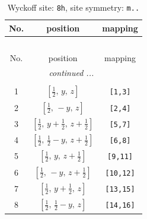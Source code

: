 \documentclass[fleqn,8pt]{jsarticle}
\begin{document}
\begin{longtable}{ccc}
\caption{Wyckoff site: {\tt 8h}, site symmetry: {\tt m..}}
 \\
 \hline \hline
No. & position & mapping \\ \hline \endfirsthead

\multicolumn{2}{l}{\tablename\ \thetable{}} \\
 \hline \hline
No. & position & mapping \\ \hline \endhead

 \hline \hline
\multicolumn{2}{r}{\footnotesize\it continued ...} \\ \endfoot

 \hline \hline
\multicolumn{2}{r}{} \\ \endlastfoot

1 & $\left[ \frac{1}{2},\, y,\, z \right]$ & {\tt [1,3]} \\ \hline
2 & $\left[ \frac{1}{2},\, - y,\, z \right]$ & {\tt [2,4]} \\ \hline
3 & $\left[ \frac{1}{2},\, y + \frac{1}{2},\, z + \frac{1}{2} \right]$ & {\tt [5,7]} \\ \hline
4 & $\left[ \frac{1}{2},\, \frac{1}{2} - y,\, z + \frac{1}{2} \right]$ & {\tt [6,8]} \\ \hline
5 & $\left[ \frac{1}{2},\, y,\, z + \frac{1}{2} \right]$ & {\tt [9,11]} \\ \hline
6 & $\left[ \frac{1}{2},\, - y,\, z + \frac{1}{2} \right]$ & {\tt [10,12]} \\ \hline
7 & $\left[ \frac{1}{2},\, y + \frac{1}{2},\, z \right]$ & {\tt [13,15]} \\ \hline
8 & $\left[ \frac{1}{2},\, \frac{1}{2} - y,\, z \right]$ & {\tt [14,16]} \\
\end{longtable}
\renewcommand{\arraystretch}{1.2}
\end{document}

